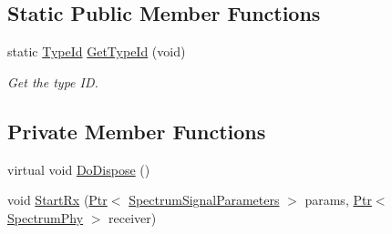 \subsection*{Static Public Member Functions}
\begin{DoxyCompactItemize}
\item 
static \hyperlink{classns3_1_1TypeId}{Type\+Id} \hyperlink{classns3_1_1SingleModelSpectrumChannel_a87f85fa88ab72983eb58303987848cbe}{Get\+Type\+Id} (void)
\begin{DoxyCompactList}\small\item\em Get the type ID. \end{DoxyCompactList}\end{DoxyCompactItemize}
\subsection*{Private Member Functions}
\begin{DoxyCompactItemize}
\item 
virtual void \hyperlink{classns3_1_1SingleModelSpectrumChannel_a1b9f60fc0c1603443feb3b15a79ac825}{Do\+Dispose} ()
\item 
void \hyperlink{classns3_1_1SingleModelSpectrumChannel_acbb96418c262802f209fc69eb16573df}{Start\+Rx} (\hyperlink{classns3_1_1Ptr}{Ptr}$<$ \hyperlink{structns3_1_1SpectrumSignalParameters}{Spectrum\+Signal\+Parameters} $>$ params, \hyperlink{classns3_1_1Ptr}{Ptr}$<$ \hyperlink{classns3_1_1SpectrumPhy}{Spectrum\+Phy} $>$ receiver)
\end{DoxyCompactItemize}
